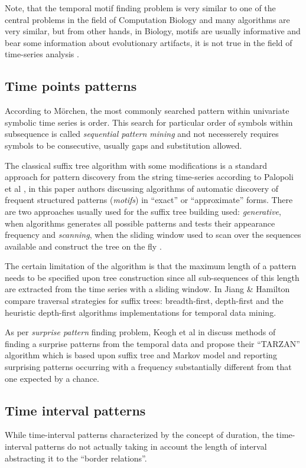 Note, that the temporal motif finding problem is very similar to one of the central problems in the field of Computation Biology \cite{citeulike:465665} and many algorithms are very similar, but from other hands, in Biology, motifs are usually informative and bear some information about evolutionary artifacts, it is not true in the field of time-series analysis \cite{citeulike:3978085}.

\subsection{Time points patterns}
According to M\"orchen, the most commonly searched pattern within univariate symbolic time series is order. This search for particular order of symbols within subsequence is called \textit{sequential pattern mining} \cite{citeulike:775528} and not necesserely requires symbols to be consecutive, usually gaps and substitution allowed.

The classical suffix tree algorithm \cite{citeulike:707616} with some modifications is a standard approach for pattern discovery from the string time-series according to Palopoli et al \cite{citeulike:5003338}, in this paper authors discussing algorithms of automatic discovery of frequent structured patterns (\textit{motifs}) in ``exact'' or ``approximate'' forms. There are two approaches usually used for the suffix tree building used: \textit{generative}, when algorithms generates all possible patterns and tests their appearance frequency \cite{citeulike:5012661} and \textit{scanning}, when the sliding window used to scan over the sequences available and construct the tree on the fly \cite{citeulike:5012661}. 

The certain limitation of the algorithm is that the maximum length of a pattern needs to be specified upon tree construction since all sub-sequences of this length are extracted from the time series with a sliding window. In \cite{citeulike:5003404} Jiang \& Hamilton compare traversal strategies for suffix trees: breadth-first, depth-first and the heuristic depth-first algorithms implementations for temporal data mining.

As per \textit{surprise pattern} finding problem, Keogh et al in \cite{citeulike:3025877} discuss methods of finding a surprise patterns from the temporal data and propose their ``TARZAN'' algorithm which is based upon suffix tree and Markov model and reporting surprising patterns occurring with a frequency substantially different from that one expected by a chance.

\subsection{Time interval patterns}
While time-interval patterns characterized by the concept of duration, the time-interval patterns do not actually taking in account the length of interval abstracting it to the ``border relations''. 
